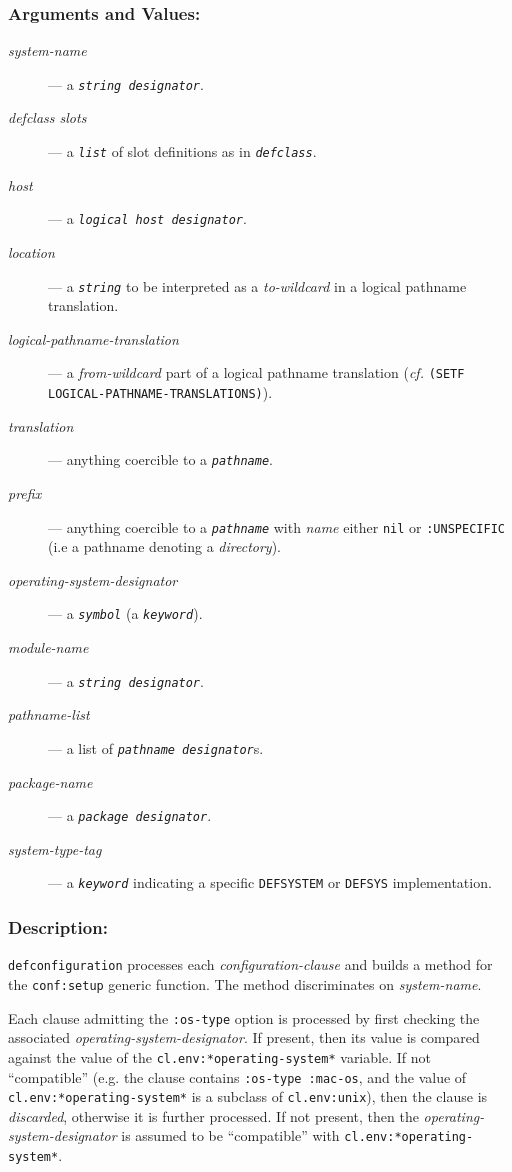 \documentclass{article}
\newcommand{\defconfiguration}{\texttt{defconfiguration}}
\newcommand{\cfr}{\textit{cf.}}
\newcommand{\code}[1]{\texttt{#1}}
\newcommand{\clobject}[1]{\texttt{\textit{#1}}} %
\newcommand{\clhsterm}[1]{\texttt{\textit{#1}}} %
\begin{document}
\subsubsection*{Arguments and Values:}

\begin{description}
\item[{\emph{system-name}}] --- a \clhsterm{string designator}.
\item[{\emph{defclass slots}}] --- a \clhsterm{list} of slot
	definitions as in \clobject{defclass}.
\item[{\emph{host}}] --- a \clhsterm{logical host designator}.
\item[{\emph{location}}] --- a \clhsterm{string}
	 to be interpreted as a
	\emph{to-wildcard} in a logical pathname translation.
\item[{\emph{logical-pathname-translation}}] --- a
	\emph{from-wildcard} part of a logical pathname translation
	(\cfr{} \code{(SETF LOGICAL-PATHNAME-TRANSLATIONS)}).
\item[{\emph{translation}}] --- anything coercible to a \clhsterm{pathname}.
\item[{\emph{prefix}}] --- anything coercible to a \clhsterm{pathname}
	with \emph{name} either \code{nil} or \code{:UNSPECIFIC} (i.e
	a pathname denoting a \emph{directory}).
\item[{\emph{operating-system-designator}}] --- a \clhsterm{symbol} (a
	\clhsterm{keyword}).
\item[{\emph{module-name}}] --- a \clhsterm{string designator}.
\item[{\emph{pathname-list}}] --- a list of \clhsterm{pathname designator}s.
\item[{\emph{package-name}}] --- a \clhsterm{package designator}.
\item[{\emph{system-type-tag}}] --- a \clhsterm{keyword} indicating a
	specific \code{DEFSYSTEM} or \code{DEFSYS} implementation.
\end{description}


\subsubsection*{Description:}

\defconfiguration{} processes each \emph{configuration-clause} and
builds a method for the \code{conf:setup} generic function.  The
method discriminates on \emph{system-name}.

Each clause admitting the \code{:os-type} option is processed by first
checking the associated \emph{operating-system-designator}. If
present, then its value is compared against the value of the
\code{cl.env:*operating-system*} variable. If not ``compatible''
(e.g. the clause contains \code{:os-type :mac-os}, and the value of
\code{cl.env:*operating-system*} is a subclass of \code{cl.env:unix}),
then the clause is \emph{discarded}, otherwise it is further processed. If
not present, then the \emph{operating-system-designator} is assumed to
be ``compatible'' with \code{cl.env:*operating-system*}.
\end{document}

